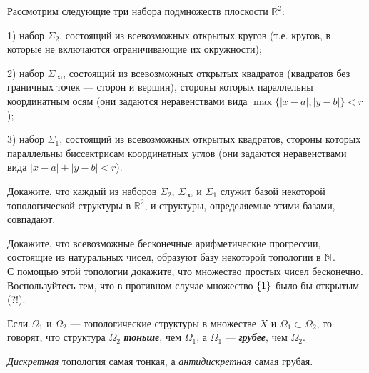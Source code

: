 \documentclass{article}
\begin{document}
    \begin{task_boxed}
        Рассмотрим следующие три набора подмножеств плоскости \(\mathbb{R}^2\):

        1) набор \(\Sigma_2\), состоящий из всевозможных открытых кругов (т.е. кругов, в которые не включаются ограничивающие их окружности);

        2) набор \(\Sigma_\infty\), состоящий из всевозможных открытых квадратов (квадратов без граничных точек — сторон и вершин), стороны которых параллельны координатным осям (они задаются неравенствами вида \(\max\{|x - a|, |y - b|\} < r\));

        3) набор \(\Sigma_1\), состоящий из всевозможных открытых квадратов, стороны которых параллельны биссектрисам координатных углов (они задаются неравенствами вида \(|x - a| + |y - b| < r\)).

        Докажите, что каждый из наборов \(\Sigma_2\), \(\Sigma_\infty\) и \(\Sigma_1\) служит базой некоторой топологической структуры в \(\mathbb{R}^2\), и структуры, определяемые этими базами, совпадают.
    \end{task_boxed}

    \begin{task_boxed}[*]
        Докажите, что всевозможные бесконечные арифметические прогрессии, состоящие из натуральных чисел, образуют базу некоторой топологии в $\N$.\\
        С помощью этой топологии докажите, что множество простых чисел бесконечно.\\
        Воспользуйтесь тем, что в противном случае множество $\set*{1}$ было бы открытым (?!).
    \end{task_boxed}

    \begin{definition_boxed}
        Если $\Omega_1$ и $\Omega_2$ — топологические структуры в множестве $X$ и $\Omega_1 \subset \Omega_2$, то говорят, что структура $\Omega_2$ \textbf{\textit{тоньше}}, чем $\Omega_1$, а $\Omega_1$ — \textbf{\textit{грубее}}, чем $\Omega_2$.
    \end{definition_boxed}

    \begin{example}
        \textit{Дискретная} топология самая тонкая, а \textit{антидискретная} самая грубая.
    \end{example}

    \newpage
\end{document}
